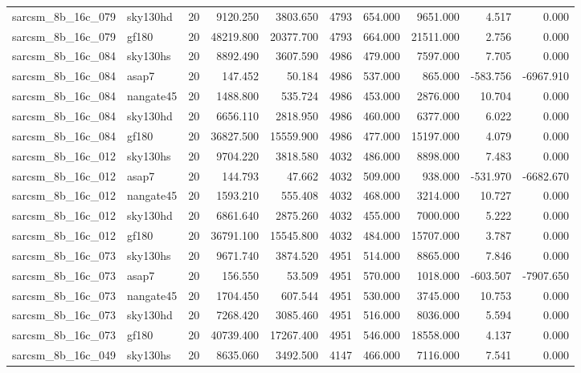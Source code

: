 \begin{tabular}{llrrrrrrrr}
sarcsm\_8b\_16c\_079 & sky130hd & 20 & 9120.250 & 3803.650 & 4793 & 654.000 & 9651.000 & 4.517 & 0.000 \\
sarcsm\_8b\_16c\_079 & gf180 & 20 & 48219.800 & 20377.700 & 4793 & 664.000 & 21511.000 & 2.756 & 0.000 \\
sarcsm\_8b\_16c\_084 & sky130hs & 20 & 8892.490 & 3607.590 & 4986 & 479.000 & 7597.000 & 7.705 & 0.000 \\
sarcsm\_8b\_16c\_084 & asap7 & 20 & 147.452 & 50.184 & 4986 & 537.000 & 865.000 & -583.756 & -6967.910 \\
sarcsm\_8b\_16c\_084 & nangate45 & 20 & 1488.800 & 535.724 & 4986 & 453.000 & 2876.000 & 10.704 & 0.000 \\
sarcsm\_8b\_16c\_084 & sky130hd & 20 & 6656.110 & 2818.950 & 4986 & 460.000 & 6377.000 & 6.022 & 0.000 \\
sarcsm\_8b\_16c\_084 & gf180 & 20 & 36827.500 & 15559.900 & 4986 & 477.000 & 15197.000 & 4.079 & 0.000 \\
sarcsm\_8b\_16c\_012 & sky130hs & 20 & 9704.220 & 3818.580 & 4032 & 486.000 & 8898.000 & 7.483 & 0.000 \\
sarcsm\_8b\_16c\_012 & asap7 & 20 & 144.793 & 47.662 & 4032 & 509.000 & 938.000 & -531.970 & -6682.670 \\
sarcsm\_8b\_16c\_012 & nangate45 & 20 & 1593.210 & 555.408 & 4032 & 468.000 & 3214.000 & 10.727 & 0.000 \\
sarcsm\_8b\_16c\_012 & sky130hd & 20 & 6861.640 & 2875.260 & 4032 & 455.000 & 7000.000 & 5.222 & 0.000 \\
sarcsm\_8b\_16c\_012 & gf180 & 20 & 36791.100 & 15545.800 & 4032 & 484.000 & 15707.000 & 3.787 & 0.000 \\
sarcsm\_8b\_16c\_073 & sky130hs & 20 & 9671.740 & 3874.520 & 4951 & 514.000 & 8865.000 & 7.846 & 0.000 \\
sarcsm\_8b\_16c\_073 & asap7 & 20 & 156.550 & 53.509 & 4951 & 570.000 & 1018.000 & -603.507 & -7907.650 \\
sarcsm\_8b\_16c\_073 & nangate45 & 20 & 1704.450 & 607.544 & 4951 & 530.000 & 3745.000 & 10.753 & 0.000 \\
sarcsm\_8b\_16c\_073 & sky130hd & 20 & 7268.420 & 3085.460 & 4951 & 516.000 & 8036.000 & 5.594 & 0.000 \\
sarcsm\_8b\_16c\_073 & gf180 & 20 & 40739.400 & 17267.400 & 4951 & 546.000 & 18558.000 & 4.137 & 0.000 \\
sarcsm\_8b\_16c\_049 & sky130hs & 20 & 8635.060 & 3492.500 & 4147 & 466.000 & 7116.000 & 7.541 & 0.000 \\

\end{tabular}
